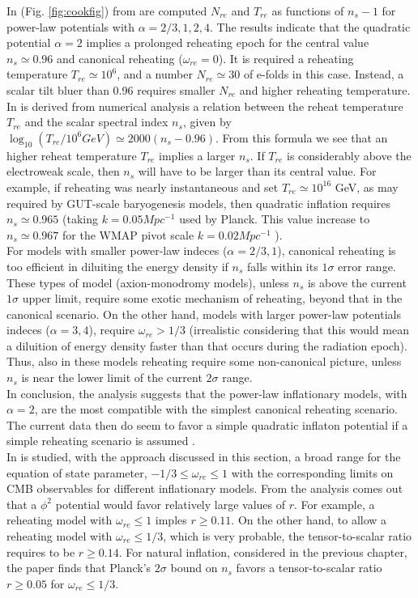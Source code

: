 \documentclass[11pt,a4paper,twoside]{book}
\begin{document}
 In (Fig. \ref{fig:cookfig}) from \cite{Chap3:Cook} are computed $ N_{re} $ and $ T_{re} $ as functions of $ n_{s}-1 $ for power-law potentials with $\alpha=2/3,1,2,4$. The results indicate that the quadratic potential $\alpha=2$ implies a prolonged reheating epoch for the central value $ n_{s} \simeq 0.96 $ and canonical reheating ($ \omega_{re} = 0 $). It is required a reheating temperature $ T_{re}\simeq 10^{6} $, and a number $ N_{re} \simeq 30 $ of e-folds in this case. Instead, a scalar tilt bluer than 0.96 requires smaller $ N_{re} $ and higher reheating temperature. In \cite{Chap3:Kai_Kamionkowsy}  is derived from  numerical analysis a relation between the reheat temperature $ T_{re} $ and the scalar spectral index $ n_{s} $, given by $ \log_{10}(T_{re}/10^{6}GeV) \simeq 2000(n_{s}-0.96) $. From this formula we see that an higher reheat temperature $ T_{re} $ implies a larger $ n_{s} $. If $ T_{re} $ is considerably above the electroweak scale, then $ n_{s} $ will have to be larger than its central value. For example, if reheating was nearly instantaneous and set $ T_{re}\simeq 10^{16} $ GeV, as may required by GUT-scale baryogenesis models, then quadratic inflation requires $ n_{s}\simeq 0.965 $ (taking $ k=0.05 Mpc^{-1} $ used by Planck. This value increase to $ n_{s} \simeq 0.967 $ for the WMAP pivot scale $ k=0.02 Mpc^{-1} $ ).\\
For models with smaller power-law indeces ($ \alpha=2/3,1 $), canonical reheating is too efficient in diluiting the energy density if $ n_{s} $ falls within its $ 1\sigma $ error range. These types of model (axion-monodromy models), unless $ n_{s} $ is above the current $ 1\sigma  $ upper limit, require some exotic mechanism of reheating, beyond that in the canonical scenario. On the other hand, models with larger power-law potentials indeces ($\alpha=3,4$), require $\omega_{re} > 1/3 $ (irrealistic considering that this would mean a diluition of energy density faster than that occurs during the radiation epoch). Thus, also in these models reheating  require some non-canonical picture, unless $ n_{s} $ is near the lower limit of the current $ 2\sigma $ range.\\
In conclusion, the analysis suggests that the power-law inflationary models, with $ \alpha=2 $, are the most compatible with the simplest canonical reheating scenario. The current data then do seem to favor a simple quadratic inflaton potential if a simple reheating scenario is assumed \cite{Chap3:Cook}.\\
In \cite{Chap3:Cook} is studied, with the approach discussed in this section, a broad range for the equation of state parameter, $ -1/3 \le \omega_{re} \le 1 $  with the corresponding limits on CMB observables for different inflationary models. From the analysis comes out that a $\phi^{2}$ potential would favor relatively large values of $ r $. For example, a reheating model with $ \omega_{re} \le 1 $ imples $ r\ge 0.11 $. On the other hand, to allow a reheating model with $\omega_{re} \le 1/3$, which is very probable, the tensor-to-scalar ratio requires to be $ r\ge 0.14 $. For natural inflation, considered in the previous chapter, the paper finds that  Planck's $ 2\sigma $ bound on $ n_{s} $ favors a tensor-to-scalar ratio $ r\ge 0.05 $ for $ \omega_{re} \le 1/3 $.
\end{document}
